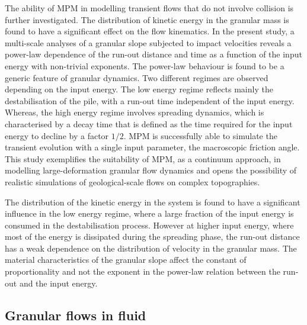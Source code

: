 The ability of MPM in modelling transient flows that do not involve collision 
is further investigated. The distribution of kinetic energy in the granular 
mass is found to have a significant effect on the flow kinematics. In the 
present study, a multi-scale analyses of a granular slope subjected to 
impact velocities reveals a power-law dependence of the run-out distance and 
time as a function of the input energy with non-trivial exponents. The 
power-law behaviour is found to be a generic feature of granular dynamics. Two 
different regimes are observed depending on the input energy. The low energy 
regime reflects mainly the destabilisation of the pile, with a run-out time 
independent of the input energy. Whereas, the high energy regime involves 
spreading dynamics, which is characterised by a decay time that is defined as 
the time required for the input energy to  decline by a factor $1/2$. MPM is 
successfully able to simulate the transient evolution with a single 
input parameter, the macroscopic friction angle. This study exemplifies the 
suitability of MPM, as a continuum approach, in modelling large-deformation 
granular flow dynamics and opens the possibility of realistic simulations of 
geological-scale flows on complex topographies.


The distribution of the kinetic energy in the system is found to have a 
significant influence in the low energy regime, where a large 
fraction of the input energy is consumed in the destabilisation process. 
However at higher input energy, where most of the energy is dissipated during 
the spreading phase, the run-out distance has a weak dependence on 
the distribution of velocity in the granular mass. The material characteristics 
of the granular slope affect the constant of proportionality and not the 
exponent in the power-law relation between the run-out and the input energy. 

\subsection{Granular flows in fluid}

